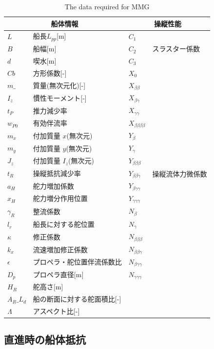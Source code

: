 \begin{table}[htbp]
 \caption{The data required for MMG}
 \label{tb:2-1}
 \centering
  \begin{tabular}{llll}
    \multicolumn{2}{c}{船体情報} & \multicolumn{2}{c}{操縦性能} \\
    \hline
    \hline
    $L$ & 船長$L_{pp}$[m] & $C_1$ & \multirow{3}{*}{スラスター係数} \\
    $B$ & 船幅[m] & $C_2$ \\
    $d$ & 喫水[m] & $C_3$ \\
    $Cb$ & 方形係数[-] & $X_0$ & \multirow{17}{*}{操縦流体力微係数} \\
    $m\_$ & 質量(無次元化)[-] & $X_{\beta \beta}$ \\
    $I_{z}$ & 慣性モーメント[-] & $X_{\beta \gamma}$ \\
    $t_P$ & 推力減少率 & $X_{\gamma \gamma}$ \\
    $w_{P0}$ & 有効伴流率 & $X_{\beta \beta \beta \beta}$ \\
    $m_x$ & 付加質量 $x$(無次元) & $Y_{\beta}$ \\
    $m_y$ & 付加質量 $y$(無次元) & $Y_{\gamma}$ \\
    $J_{z}$ & 付加質量 $I_z$(無次元) & $Y_{\beta \beta \beta}$ \\
    $t_R$ & 操縦抵抗減少率 & $Y_{\beta \beta \gamma}$ \\
    $a_H$ & 舵力増加係数 & $Y_{\beta \gamma \gamma}$ \\
    $x_H$ & 舵力増分作用位置 & $Y_{\gamma \gamma \gamma}$ \\
    $\gamma_R$ & 整流係数 & $N_{\beta}$ \\
    $l_r$ & 船長に対する舵位置 & $N_{\gamma}$ \\
    $\kappa$ & 修正係数 & $N_{\beta \beta \beta}$ \\
    $k_x$ & 流速増加修正係数 & $N_{\beta \beta \gamma}$ \\
    $\epsilon$ & プロペラ・舵位置伴流係数比 & $N_{\beta \gamma \gamma}$ \\
    $D_p$ & プロペラ直径[m] & $N_{\gamma \gamma \gamma}$ \\
    $H_R$ & 舵高さ[m] \\
    $A_R \_ L_d$ & 船の断面に対する舵面積比[-] \\
    $\Lambda$ & アスペクト比[-]
  \end{tabular}
\end{table}

\subsection{直進時の船体抵抗}

